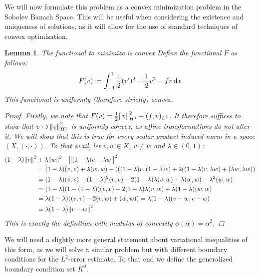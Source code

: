 \documentclass[headsepline,footsepline,footinclude=false,oneside,fontsize=11pt,paper=a4,listof=totoc,bibliography=totoc]{scrbook} %
\newtheorem{lemma}{Lemma}
\begin{document}
We will now formulate this problem as a convex minimization problem in the Sobolev Banach Space. This will be useful when considering the existence and uniqueness of solutions, as it will allow for the use of standard techniques of convex optimization.

\begin{lemma} The functional to minimize is convex \newline
	Define the functional $F$ as follows:
	\begin{equation}
			F(v) \coloneqq \int_{-1}^1{\frac{1}{2} (v')^2 + \frac{1}{2} v^2 - fv \dif x}
	\end{equation}
	This functional is uniformly (therefore strictly) convex.
	\begin{proof}
		Firstly, we note that $F(v) = \frac{1}{2} \norm{v}_{H^1}^2 - (f,v)_{L^2} $. It therefore suffices to show that $v \mapsto \norm{v}_{H^1}^2$ is uniformly convex, as affine transformations do not alter it. We will show that this is true for every scalar-product induced norm in a space $(X, (\cdot,\cdot))$. To that avail, let $v,w \in X$, $v \neq w$ and $\lambda \in (0,1)$:
		\begin{align*}
		(1-\lambda)\norm{v}^2 &+ \lambda\norm{w}^2 - \norm{(1-\lambda)v - \lambda w}^2 \\
		& = (1-\lambda) (v,v) + \lambda (w,w) - (((1-\lambda)v,(1-\lambda)v) + 2((1-\lambda)v, \lambda w)+ (\lambda w, \lambda w)) \\
		&= (1-\lambda) (v,v) - (1-\lambda)^2 (v,v) - 2 (1-\lambda)\lambda(v,w) + \lambda (w,w) - \lambda^2 (w,w) \\
		&= (1-\lambda)(1-(1-\lambda))(v,v)- 2 (1-\lambda)\lambda(v,w) + \lambda (1-\lambda)(w,w) \\
		&= \lambda(1- \lambda)((v,v) - 2(v,w)+(w,w)) = \lambda(1-\lambda)(v-w,v-w) \\
		&= \lambda(1-\lambda)\norm{v-w}^2
		\end{align*}
		This is exactly the definition with modulus of convexity $\phi(\alpha) = \alpha ^2$.
	\end{proof}
\end{lemma}

We will need a slightly more general statement about variational inequalities of this form, as we will solve a similar problem but with different boundary conditions for the $L^2$-error estimate. To that end we define the generalized boundary condition set $K^0$.
\end{document}
